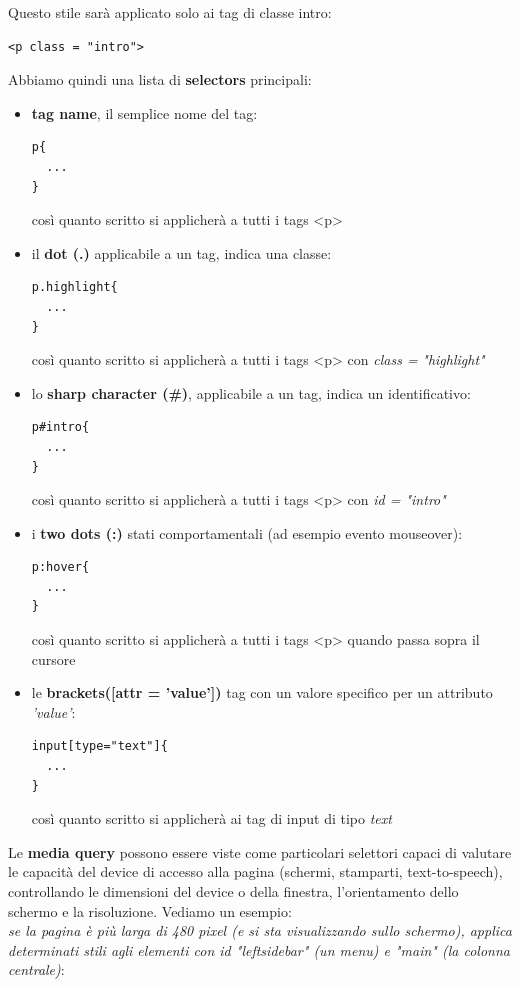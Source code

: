 \documentclass[a4paper,12pt, oneside]{book}
\begin{document}
Questo stile sarà applicato solo ai tag di classe intro:
\begin{verbatim}
<p class = "intro">
\end{verbatim}
Abbiamo quindi una lista di \textbf{selectors} principali:
\begin{itemize}
	\item \textbf{tag name}, il semplice nome del tag:
	      \begin{verbatim}
p{
  ...
}
\end{verbatim}
	      così quanto scritto si applicherà a tutti i tags <p>
	\item il \textbf{dot (.)} applicabile a un tag, indica una classe:
	      \begin{verbatim}
p.highlight{
  ...
}
\end{verbatim}
	      così quanto scritto si applicherà a tutti i tags <p> con \textit{class =} \textit{"highlight"}
	\item lo \textbf{sharp character (\#)}, applicabile a un tag, indica un identificativo:
	      \begin{verbatim}
p#intro{
  ...
}
\end{verbatim}
	      così quanto scritto si applicherà a tutti i tags <p> con \textit{id = "intro"}
	\item i \textbf{two dots (:)} stati comportamentali (ad esempio evento mouseover):
	      \begin{verbatim}
p:hover{
  ...
}
\end{verbatim}
	      così quanto scritto si applicherà a tutti i tags <p> quando passa sopra il cursore
	\item le \textbf{brackets([attr = 'value'])} tag con un valore specifico per un attributo \textit{'value'}:
	      \begin{verbatim}
input[type="text"]{
  ...
}
\end{verbatim}
	      così quanto scritto si applicherà ai tag di input di tipo \textit{text}
\end{itemize}
Le \textbf{media query} possono essere viste come particolari selettori capaci di valutare le capacità del device di accesso alla pagina (schermi, stamparti, text-to-speech), controllando le dimensioni del device o della finestra, l'orientamento dello schermo e la risoluzione. Vediamo un esempio:\\
\textit{se la pagina è più larga di 480
	pixel (e si sta visualizzando sullo schermo), applica
	determinati stili agli elementi con id "leftsidebar" (un menu) e "main" (la colonna centrale)}:
\end{document}
